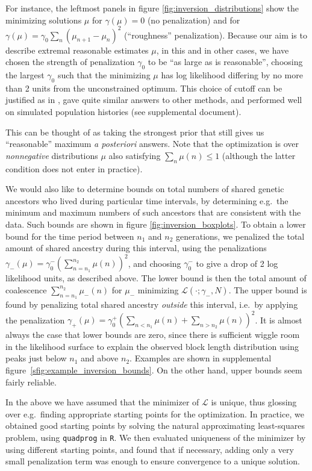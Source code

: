 \documentclass{article}
\newcommand{\calL}{\mathcal{L}}
\begin{document}
For instance, the leftmost panels in figure \ref{fig:inversion_distributions}
show the minimizing solutions $\mu$ for $\gamma(\mu)=0$ (no penalization)
and for $\gamma(\mu) = \gamma_0 \sum_n (\mu_{n+1}-\mu_n)^2$ (``roughness'' penalization).
Because our aim is to describe extremal reasonable estimates $\mu$,
in this and in other cases, we have chosen the strength of penalization $\gamma_0$
to be ``as large as is reasonable'', 
choosing the largest $\gamma_0$ such that the minimizing $\mu$ has log likelihood
differing by no more than 2 units from the unconstrained optimum.
This choice of cutoff can be justified as in \citet{edwards1984likelihood},
gave quite similar answers to other methods, and performed well
on simulated population histories (see supplemental document).


This can be thought of as taking the strongest prior that still gives us ``reasonable'' maximum {\it a posteriori} answers.
Note that the optimization is over {\em nonnegative} distributions $\mu$ 
also satisfying $\sum_n \mu(n) \le 1$ 
(although the latter condition does not enter in practice).

We would also like to determine bounds on total numbers of shared genetic ancestors who lived during particular time intervals,
by determining e.g.\ the minimum and maximum numbers of such ancestors that are consistent with the data.
Such bounds are shown in figure \ref{fig:inversion_boxplots}.
To obtain a lower bound for the time period between $n_1$ and $n_2$ generations,
we penalized the total amount of shared ancestry during this interval,
using the penalizations $\gamma_-(\mu) = \gamma_0^- \left( \sum_{n=n_1}^{n_2} \mu(n) \right)^2$,
and choosing $\gamma_0^-$ to give a drop of 2 log likelihood units, as described above.
The lower bound is then the total amount of coalescence $\sum_{n =n_1}^{n_2} \mu_-(n)$ for $\mu_-$ minimizing $\calL(\cdot;\gamma_-,N)$.
The upper bound is found by penalizing total shared ancestry {\em outside} this interval,
i.e.\ by applying the penalization $\gamma_+(\mu) = \gamma_0^+ \left( \sum_{n<n_1} \mu(n) + \sum_{n>n_2} \mu(n) \right)^2$.
It is almost always the case that lower bounds are zero,
since there is sufficient wiggle room in the likelihood surface to explain the observed block length distribution
using peaks just below $n_1$ and above $n_2$.
Examples are shown in supplemental figure~\ref{sfig:example_inversion_bounds}.
On the other hand, upper bounds seem fairly reliable.

In the above we have assumed that the minimizer of $\calL$ is unique,
thus glossing over e.g.\ finding appropriate starting points for the optimization.
In practice, we obtained good starting points by solving the natural approximating least-squares problem,
using {\tt quadprog} \citep{quadprog} in {\tt R}.
We then evaluated uniqueness of the minimizer by using different starting points,
and found that if necessary, adding only a very small penalization term was enough to ensure convergence to a unique solution.
\end{document}
